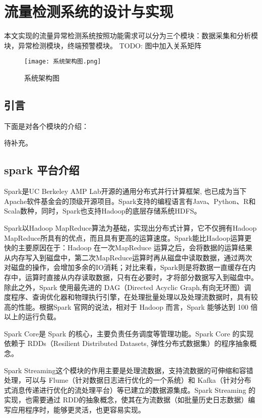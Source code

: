 \chapter{流量检测系统的设计与实现}
本文实现的流量异常检测系统按照功能需求可以分为三个模块：数据采集和分析模块，异常检测模块，终端预警模块。
TODO: 图中加入关系矩阵
\begin{figure}
    \centering
    \texttt{[image: 系统架构图.png]}
    \caption{系统架构图}
    \label{fig:arch}
  \end{figure}

\section{引言}
下面是对各个模块的介绍：

待补充。

\section{spark 平台介绍}
Spark是UC Berkeley AMP Lab开源的通用分布式并行计算框架, 也已成为当下Apache软件基金会的顶级开源项目。Spark支持的编程语言有Java、Python、R和Scala数种，同时，Spark也支持Hadoop的底层存储系统HDFS。

Spark以Hadoop MapReduce算法为基础，实现出分布式计算，它不仅拥有Hadoop MapReduce所具有的优点，而且具有更高的运算速度。Spark能比Hadoop运算更快的主要原因在于：Hadoop 在一次MapReduce 运算之后，会将数据的运算结果从内存写入到磁盘中，第二次MapReduce运算时再从磁盘中读取数据，通过两次对磁盘的操作，会增加多余的IO消耗；对比来看，Spark则是将数据一直缓存在内存中，运算时直接从内存读取数据，只有在必要时，才将部分数据写入到磁盘中。除此之外，Spark 使用最先进的 DAG（Directed Acyclic Graph,有向无环图）调度程序、查询优化器和物理执行引擎，在处理批量处理以及处理流数据时，具有较高的性能。根据Spark 官网的说法，相对于 Hadoop 而言，Spark 能够达到 100 倍以上的运行负载。




Spark Core是 Spark 的核心，主要负责任务调度等管理功能。Spark
Core 的实现依赖于 RDDs（Resilient Distributed Datasets,
弹性分布式数据集）的程序抽象概念。

Spark Streaming这个模块的作用主要是处理流数据，支持流数据的可伸缩和容错处理，可以与 Flume（针对数据日志进行优化的一个系统）和 Kafka（针对分布式消息传递进行优化的流处理平台）等已建立的数据源集成。Spark Streaming 的实现，也需要通过 RDD的抽象概念，使其在为流数据（如批量历史日志数据）编写应用程序时，能够更灵活，也更容易实现。


